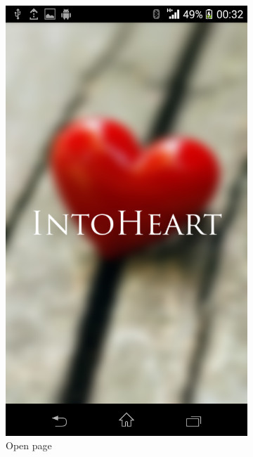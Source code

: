 \begin{figure}
\begin{subfigure}{.24\textwidth}
  \includegraphics[width=.8\linewidth]{img/screenshot/ss10.png}
  \caption{Open page}
\end{subfigure}
\begin{subfigure}{.24\textwidth}
  \centering

\end{subfigure}
\end{figure}
